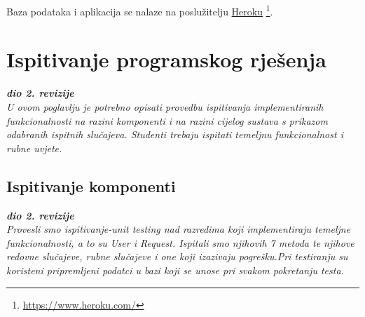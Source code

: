             Baza podataka i aplikacija se nalaze na poslužitelju \underline{Heroku}
            \footnote{\url{https://www.heroku.com/}}.
            
        
\newpage 

		    \section{Ispitivanje programskog rješenja}
			
			\textbf{\textit{dio 2. revizije}}\\
			
			 \textit{U ovom poglavlju je potrebno opisati provedbu ispitivanja implementiranih funkcionalnosti na razini komponenti i na razini cijelog sustava s prikazom odabranih ispitnih slučajeva. Studenti trebaju ispitati temeljnu funkcionalnost i rubne uvjete.}
           
        \subsection{Ispitivanje komponenti}
		    
		    \textbf{\textit{dio 2. revizije}}\\
    
			\textit { Provesli smo  ispitivanje-unit testing nad razredima koji implementiraju temeljne funkcionalnosti, a to su User i Request. Ispitali smo njihovih 7 metoda te njihove redovne slučajeve, rubne slučajeve i one koji izazivaju pogrešku.Pri testiranju su koristeni pripremljeni podatci u bazi koji se unose pri svakom pokretanju testa. }
			
